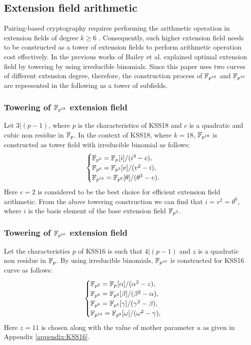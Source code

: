 \subsection{Extension field arithmetic}
Pairing-based cryptography requires  performing the arithmetic operation in extension fields of degree $k \geq 6$ \cite{Silverman}. Consequently, such higher extension field needs to be constructed as a tower of extension fields \cite{const_ext} to perform arithmetic operation cost effectively. In the previous works of Bailey et al. \cite{OEF} explained optimal extension field by towering by using irreducible binomials. Since this paper uses two curves of different extension degree, therefore, the construction process of $\mathbb{F}_{p^{18}}$ and $\mathbb{F}_{p^{16}}$ are represented in the following as a tower of subfields. 

\subsubsection{Towering of $\mathbb{F}_{p^{18}}$ extension field}
Let $3|(p-1)$, where $p$ is the characteristics of KSS18 and $c$ is a quadratic and cubic non residue in ${\mathbb{F}}_{p}$. In the context  of KSS18, where $k=18$, $\mathbb{F}_{p^{18}}$ is constructed as tower field with irreducible binomial as follows:
\begin{equation}\label{eq:KSS18_towering}
\begin{cases}
{\mathbb{F}}_{p^{3}} = {\mathbb{F}}_{p^{}}[i]/(i^3-c),  \\ 
{\mathbb{F}}_{p^{6}} = {\mathbb{F}}_{p^{3}}[v]/(v^2-i),  \\ 
{\mathbb{F}}_{p^{18}} = {\mathbb{F}}_{p^{6}}[\theta]/(\theta^3-v). \\ 
\end{cases}
\end{equation}
Here $c = 2$ is considered to be the best choice for efficient extension field arithmetic.
From the above towering construction we can find that $i=v^2=\theta^6$, where $i$ is the basis element of the base extension field $\mathbb{F}_{p^3}$. 

\subsubsection{Towering of $\mathbb{F}_{p^{16}}$ extension field}
Let the characteristics $p$ of KSS16 is such that  $4|(p-1)$  and $z$ is a quadratic non residue in ${\mathbb{F}}_{p}$. By using irreducible binomials, $\mathbb{F}_{p^{16}}$ is constructed for KSS16 curve  as follows:
\begin{equation}\label{eq_bls_towering}
\begin{cases}
{\mathbb{F}}_{p^{2}} = {\mathbb{F}}_{p^{}}[\alpha]/(\alpha^2-z),  \\ 
{\mathbb{F}}_{p^{4}} = {\mathbb{F}}_{p^{2}}[\beta]/(\beta^2-\alpha),  \\ 
{\mathbb{F}}_{p^{8}} = {\mathbb{F}}_{p^{4}}[\gamma]/(\gamma^2-\beta), \\ 
{\mathbb{F}}_{p^{16}} = {\mathbb{F}}_{p^{8}}[\omega]/(\omega^2-\gamma), \\ 
\end{cases}
\end{equation}
Here $z = 11$ is chosen along with the value of mother parameter $u$ as given in Appendix \ref{appendix:KSS16}.

